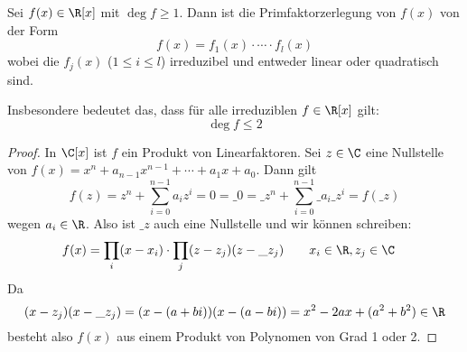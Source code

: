 \documentclass{mycourse}
\begin{document}
\begin{prop}
	\label{prop:13.22}
	Sei $f(x)\in \R[x]$ mit $\deg f \ge 1$.
	Dann ist die Primfaktorzerlegung von $f(x)$ von der Form
	\[
		f(x) = f_1(x) \cdot \dotsb \cdot f_l(x)
	\]
	wobei die $f_j(x)$ ($1\le i\le l$) irreduzibel und entweder linear oder quadratisch sind.
	\begin{note}
		Insbesondere bedeutet das, dass für alle irreduziblen $f \in \R[x]$ gilt:
		\[
			\deg f \le 2
		\]
	\end{note}
	\begin{proof}
		In $\C[x]$ ist $f$ ein Produkt von Linearfaktoren.
		Sei $z\in \C$ eine Nullstelle von $f(x) = x^n + a_{n-1}x^{n-1} + \dotsb + a_1x + a_0$.
		Dann gilt
		\[
			f(z) = z^n + \sum_{i=0}^{n-1}a_iz^i = 0 = \_0 = \_z^n + \sum_{i=0}^{n-1}\_{a_i}\_z^i = f(\_z)
		\]
		wegen $a_i\in \R$.
		Also ist $\_z$ auch eine Nullstelle und wir können schreiben:
		\begin{align*}
			f(x) &= \prod_{i}(x-x_i)\cdot \prod_{j}(z-z_j)(z-\_z_j) \qquad x_i\in \R, z_j\in \C
		\end{align*}
		Da
		\[
			(x-z_j)(x-\_z_j) = (x-(a+bi))(x-(a-bi)) = x^2 - 2ax + (a^2+b^2) \in \R
		\]
		besteht also $f(x)$ aus einem Produkt von Polynomen von Grad 1 oder 2.
	\end{proof}
\end{prop}
\end{document}
